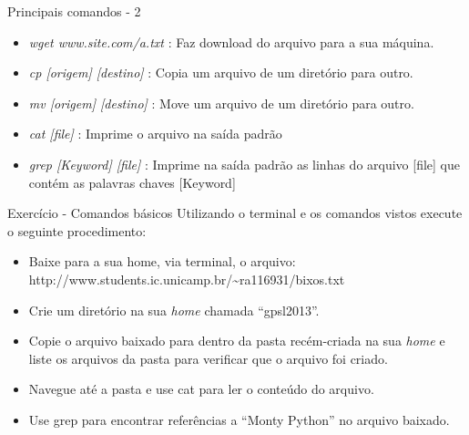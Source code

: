 \documentclass{beamer}
\begin{document}
\begin{frame}{Principais comandos - 2}
   \begin{itemize}
   \item \emph{wget www.site.com/a.txt} : Faz download do arquivo para a sua
     máquina.
   \item \emph{cp [origem] [destino]} : Copia um arquivo de um diretório para
     outro.
   \item \emph{mv [origem] [destino]} : Move um arquivo de um diretório para
     outro.
   \item \emph{cat [file]} : Imprime o arquivo na saída padrão
   \item \emph{grep [Keyword] [file]} : Imprime na saída padrão as linhas do
     arquivo [file] que contém as palavras chaves [Keyword]
   \end{itemize}
\end{frame}


\begin{frame}{Exercício - Comandos básicos}
  Utilizando o terminal e os comandos vistos execute o seguinte procedimento:
  \begin{itemize}
  \item Baixe para a sua home, via terminal, o arquivo:
    http://www.students.ic.unicamp.br/\~{}ra116931/bixos.txt
  \item Crie um diretório na sua \emph{home} chamada ``gpsl2013''.
  \item Copie o arquivo baixado para dentro da pasta recém-criada na sua
    \emph{home} e liste os arquivos da pasta para verificar que o arquivo foi
    criado.
  \item Navegue até a pasta e use cat para ler o conteúdo do arquivo.
  \item Use grep para encontrar referências a ``Monty Python'' no arquivo
    baixado.
  \end{itemize}
\end{frame}
\end{document}
